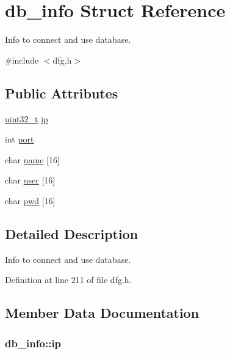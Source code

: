 \hypertarget{structdb__info}{\section{db\-\_\-info Struct Reference}
\label{structdb__info}
}


Info to connect and use database.  




{\ttfamily \#include $<$dfg.\-h$>$}

\subsection*{Public Attributes}
\begin{DoxyCompactItemize}
\item 
\hyperlink{msus_2webserver_2uthash_8h_a435d1572bf3f880d55459d9805097f62}{uint32\-\_\-t} \hyperlink{structdb__info_aba75067e46a9527b5b20a89a6a23c150}{ip}
\item 
int \hyperlink{structdb__info_ac425055e92c9cb6184e59126de818c25}{port}
\item 
char \hyperlink{structdb__info_a753b946bdb75a251d7c277feeddf6722}{name} \mbox{[}16\mbox{]}
\item 
char \hyperlink{structdb__info_a7c2c04a11003ece96e0cdbf3e1e27c60}{user} \mbox{[}16\mbox{]}
\item 
char \hyperlink{structdb__info_a498110579dc8f32bed3f6589ddc6d3cb}{pwd} \mbox{[}16\mbox{]}
\end{DoxyCompactItemize}


\subsection{Detailed Description}
Info to connect and use database. 

Definition at line 211 of file dfg.\-h.



\subsection{Member Data Documentation}
\hypertarget{structdb__info_aba75067e46a9527b5b20a89a6a23c150}{
\subsubsection[{ip}]{ db\-\_\-info\-::ip}}\label{structdb__info_aba75067e46a9527b5b20a89a6a23c150}


